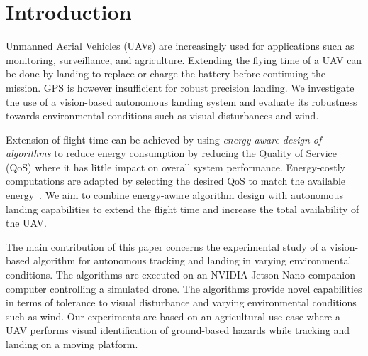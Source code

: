 \documentclass[conference]{IEEEtran}
\begin{document}
\section{Introduction}
\label{sec:introduction}

Unmanned Aerial Vehicles (UAVs) are increasingly used for applications
such as monitoring, surveillance, %
and agriculture. %
%
Extending the flying time of a UAV can be done by landing to
replace or charge the battery before continuing the
mission. 
%
GPS is however insufficient for robust precision landing. %
We investigate the use of a 
vision-based autonomous landing system and evaluate its robustness
towards environmental conditions such as visual disturbances and wind.

Extension of flight time can be achieved by using
\emph{energy-aware design of algorithms} to reduce energy consumption
by reducing the Quality of Service (QoS) where it has little impact on overall system performance. 
Energy-costly computations %
are adapted by
selecting the desired QoS to match the available
energy~\cite{seewald2020mechanical}. %
We aim to combine energy-aware algorithm design with autonomous landing
capabilities to extend the flight time and increase the total availability of the UAV. %


The main contribution of this paper concerns the experimental study of
a vision-based algorithm for autonomous
tracking and landing in varying environmental conditions. The
algorithms are executed on an NVIDIA Jetson Nano companion computer
controlling a simulated drone. The %
algorithms provide novel capabilities in terms of tolerance to visual
disturbance and varying environmental conditions such as wind.
%
Our experiments are based on an agricultural use-case where a
UAV performs visual identification of ground-based hazards
while tracking and landing on a moving platform.
%
\end{document}
